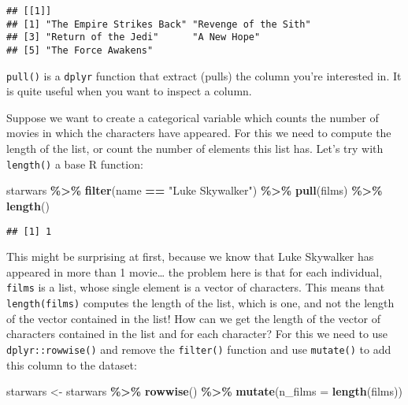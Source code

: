 \documentclass[
]{article}
\newenvironment{Shaded}{\begin{snugshade}}{\end{snugshade}}
\newcommand{\DataTypeTok}[1]{\textcolor[rgb]{0.13,0.29,0.53}{#1}}
\newcommand{\KeywordTok}[1]{\textcolor[rgb]{0.13,0.29,0.53}{\textbf{#1}}}
\newcommand{\NormalTok}[1]{#1}
\newcommand{\OperatorTok}[1]{\textcolor[rgb]{0.81,0.36,0.00}{\textbf{#1}}}
\newcommand{\StringTok}[1]{\textcolor[rgb]{0.31,0.60,0.02}{#1}}
\begin{document}
\begin{verbatim}
## [[1]]
## [1] "The Empire Strikes Back" "Revenge of the Sith"    
## [3] "Return of the Jedi"      "A New Hope"             
## [5] "The Force Awakens"
\end{verbatim}

\texttt{pull()} is a \texttt{dplyr} function that extract (pulls) the column you're interested in. It is quite
useful when you want to inspect a column.

Suppose we want to create a categorical variable which counts the number of movies in which the
characters have appeared. For this we need to compute the length of the list, or count the number
of elements this list has. Let's try with \texttt{length()} a base R function:

\begin{Shaded}
\begin{Highlighting}[]
\NormalTok{starwars }\OperatorTok{\%\textgreater{}\%}
\StringTok{  }\KeywordTok{filter}\NormalTok{(name }\OperatorTok{==}\StringTok{ "Luke Skywalker"}\NormalTok{) }\OperatorTok{\%\textgreater{}\%}
\StringTok{  }\KeywordTok{pull}\NormalTok{(films) }\OperatorTok{\%\textgreater{}\%}
\StringTok{  }\KeywordTok{length}\NormalTok{()}
\end{Highlighting}
\end{Shaded}

\begin{verbatim}
## [1] 1
\end{verbatim}

This might be surprising at first, because we know that Luke Skywalker has appeared in more than 1
movie\ldots{} the problem here is that for each individual, \texttt{films} is a list, whose single element is
a vector of characters. This means that \texttt{length(films)} computes the length of the list, which is
one, and not the length of the vector contained in the list! How can we get the length of the
vector of characters contained in the list and for each character? For this we need to use
\texttt{dplyr::rowwise()} and remove the \texttt{filter()} function and use \texttt{mutate()} to add this column to the
dataset:

\begin{Shaded}
\begin{Highlighting}[]
\NormalTok{starwars \textless{}{-}}\StringTok{ }\NormalTok{starwars }\OperatorTok{\%\textgreater{}\%}
\StringTok{  }\KeywordTok{rowwise}\NormalTok{() }\OperatorTok{\%\textgreater{}\%}
\StringTok{  }\KeywordTok{mutate}\NormalTok{(}\DataTypeTok{n\_films =} \KeywordTok{length}\NormalTok{(films))}
\end{Highlighting}
\end{Shaded}
\end{document}

